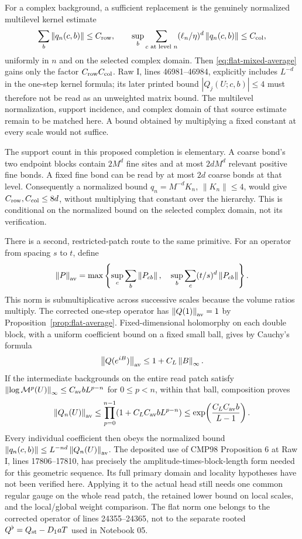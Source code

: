 \documentclass[11pt]{article}
\theoremstyle{remark}
\newcommand{\norm}[1]{\left\|#1\right\|}
\begin{document}
For a complex background, a sufficient replacement is the genuinely
normalized multilevel kernel estimate
\begin{equation}\label{eq:complex-average-needed}
 \sum_b\norm{q_n(c,b)}\le C_{\rm row},\qquad
 \sup_b\sum_{c\text{ at level }n}
    (\ell_n/\eta)^d\norm{q_n(c,b)}\le C_{\rm col},
\end{equation}
uniformly in $n$ and on the selected complex domain.
Then \eqref{eq:flat-mixed-average} gains only the factor
$C_{\rm row}C_{\rm col}$. Raw I, lines 46981--46984, explicitly
includes $L^{-d}$ in the one-step kernel formula; its later printed
bound $|Q_j(U;c,b)|\le4$ must therefore not be read as an unweighted
matrix bound. The multilevel normalization, support incidence, and
complex domain of that source estimate remain to be matched here.
A bound obtained by multiplying a fixed constant at every scale
would not suffice.

The support count in this proposed completion is elementary. A
coarse bond's two endpoint blocks contain $2M^d$ fine sites and at
most $2dM^d$ relevant positive fine bonds. A fixed fine bond can be
read by at most $2d$ coarse bonds at that level. Consequently a
normalized bound $q_n=M^{-d}K_n$, $\norm{K_n}\le4$, would give
$C_{\rm row},C_{\rm col}\le8d$, without multiplying that constant
over the hierarchy. This is conditional on the normalized bound on
the selected complex domain, not its verification.

There is a second, restricted-patch route to the same primitive.
For an operator from spacing $s$ to $t$, define
\[
 \norm P_{\rm av}=\max\left\{
 \sup_c\sum_b\norm{P_{cb}},\quad
 \sup_b\sum_c(t/s)^d\norm{P_{cb}}\right\}.
\]
This norm is submultiplicative across successive scales because the
volume ratios multiply. The corrected one-step operator has
$\norm{Q(1)}_{\rm av}=1$ by Proposition~\ref{prop:flat-average}.
Fixed-dimensional holomorphy on each double block, with a uniform
coefficient bound on a fixed small ball, gives by Cauchy's formula
\[
 \norm{Q(e^{iB})}_{\rm av}\le1+C_L\norm B_\infty.
\]
If the intermediate backgrounds on the entire read patch satisfy
$\norm{\log\mathcal M^p(U)}_\infty\le C_{\rm av}bL^{p-n}$
for $0\le p<n$, within that ball, composition proves
\[
 \norm{Q_n(U)}_{\rm av}
 \le\prod_{p=0}^{n-1}(1+C_LC_{\rm av}bL^{p-n})
 \le\exp\!\left(\frac{C_LC_{\rm av}b}{L-1}\right).
\]
Every individual coefficient then obeys the normalized bound
$\norm{q_n(c,b)}\le L^{-nd}\norm{Q_n(U)}_{\rm av}$.
The deposited use of CMP98 Proposition 6 at Raw I, lines
17806--17810, has precisely the amplitude-times-block-length form
needed for this geometric sequence. Its full primary domain and
locality hypotheses have not been verified here. Applying it to
the actual head still needs one common regular gauge on the whole
read patch, the retained lower bound on local scales, and the
local/global weight comparison. The flat norm one belongs to the
corrected operator of lines 24355--24365, not to the separate rooted
$Q^\flat=Q_{\rm st}-D_1aT$ used in Notebook 05.
\end{document}
